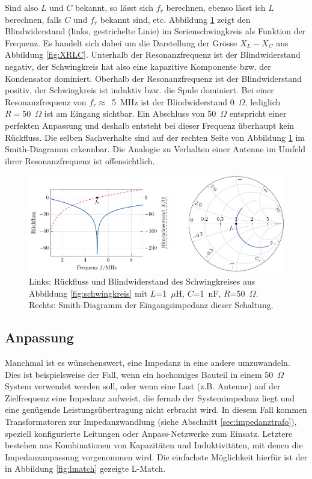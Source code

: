 \documentclass[twoside,a4paper,11pt,halfparskip,DIV=11,notitlepage]{scrartcl}
\begin{document}
Sind also $L$ und $C$ bekannt, so lässt sich $f_r$ berechnen, ebenso lässt ich
$L$ berechnen, falls $C$ und $f_r$ bekannt sind, etc. Abbildung \ref{fig:resonanzplot}
zeigt den Blindwiderstand (links, gestrichelte Linie) im Serienschwingkreis als Funktion der Frequenz. Es
handelt sich dabei um die Darstellung der Grösse $X_L-X_C$ aus Abbildung \ref{fig:XRLC}.
Unterhalb der Resonanzfrequenz ist der Blindwiderstand negativ, der
Schwingkreis hat also eine kapazitive Komponente bzw. der Kondensator
dominiert. Oberhalb der Resonanzfrequenz ist der Blindwiderstand positiv, der
Schwingkreis ist induktiv bzw. die Spule dominiert. Bei einer Resonanzfrequenz
von $f_r\approx$~5~MHz ist der Blindwiderstand 0~$\Omega$, lediglich $R=50$~$\Omega$
ist am Eingang sichtbar. Ein Abschluss von 50~$\Omega$ entspricht einer perfekten
Anpassung und deshalb entsteht bei dieser Frequenz überhaupt kein Rückfluss.
Die selben Sachverhalte sind auf der rechten Seite von Abbildung
\ref{fig:resonanzplot} im Smith-Diagramm erkennbar. Die Analogie zu Verhalten
einer Antenne im Umfeld ihrer Resonanzfrequenz ist offensichtlich.
\begin{figure}
    \begin{center}\includegraphics[scale=0.8]{figures/resonance_plots/resonance_plots.pdf}\end{center}
\caption{Links: Rückfluss und Blindwiderstand des Schwingkreises aus Abbildung \ref{fig:schwingkreis} mit 
$L$=1~$\mu$H, $C$=1~nF, $R$=50~$\Omega$. Rechts: Smith-Diagramm der Eingangsimpedanz dieser Schaltung.}
\label{fig:resonanzplot}
\end{figure}

\subsection{Anpassung}
Manchmal ist es wünschenswert, eine Impedanz in eine andere umzuwandeln. Dies ist beispielsweise der Fall,
wenn ein hochomiges Bauteil in einem 50~$\Omega$ System verwendet werden soll, oder wenn eine Last
(z.B. Antenne) auf der Zielfrequenz eine Impedanz aufweist, die fernab der Systemimpedanz liegt und eine
genügende Leistungsübertragung nicht erbracht wird. In diesem Fall kommen Transformatoren zur Impedanzwandlung
(siehe Abschnitt \ref{sec:impedanztrafo}), speziell konfigurierte Leitungen
oder Anpass-Netzwerke zum Einsatz. Letztere bestehen aus Kombinationen von Kapazitäten und Induktivitäten,
mit denen die Impedanzanpassung vorgenommen wird. Die einfachste Möglichkeit hierfür ist der in Abbildung
\ref{fig:lmatch} gezeigte L-Match.
\end{document}
